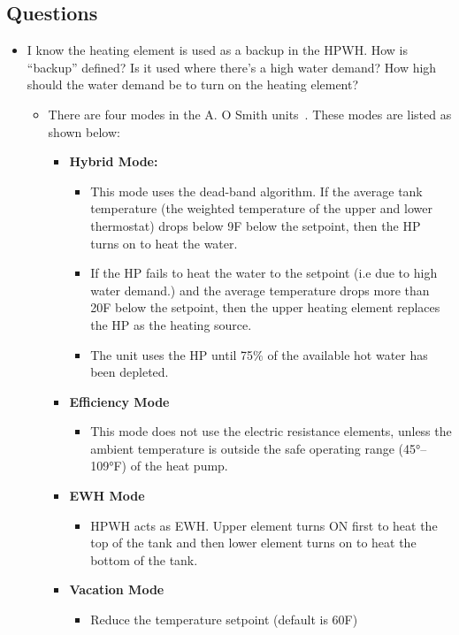 \subsection{Questions}
\begin{itemize}
    \item I know the heating element is used as a backup in the HPWH. How is “backup” defined? Is it used where there’s a high water demand? How high should the water demand be to turn on the heating element?
    \begin{itemize}
        \item There are four modes in the A. O Smith units~\cite{r1}. These modes are listed as shown below:
        \begin{itemize}
            \item \textbf{Hybrid Mode:}
            \begin{itemize}
                \item This mode uses the dead-band algorithm. If the average tank temperature (the weighted temperature of the upper and lower thermostat) drops below 9F below the setpoint, then the HP turns on to heat the water.
                \item If the HP fails to heat the water to the setpoint (i.e due to high water demand.) and the average temperature drops more than 20F below the setpoint, then the upper heating element replaces the HP as the heating source. 
                \item The unit uses the HP until 75$\%$ of the available hot water has been depleted. 
            \end{itemize}
            \item \textbf{Efficiency Mode}
            \begin{itemize}
                \item This mode does not use the electric resistance elements, unless the ambient temperature is outside the safe operating range (45°–109°F) of the heat pump.
            \end{itemize}
            \item \textbf{EWH Mode}
            \begin{itemize}
                \item HPWH acts as EWH. Upper element turns ON first to heat the top of the tank and then lower element turns on to heat the bottom of the tank.
            \end{itemize}
            \item \textbf{Vacation Mode}
            \begin{itemize}
                \item Reduce the temperature setpoint (default is 60F)
            \end{itemize}
        \end{itemize}
    \end{itemize}
\end{itemize}

